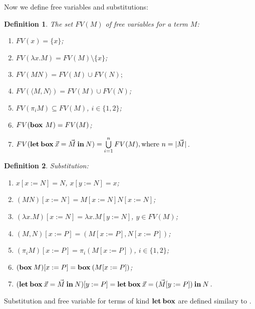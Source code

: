 \documentclass[a4paper]{article}
\newtheorem{defin}{Definition}
\begin{document}
  Now we define free variables and substitutions:

  \begin{defin} The set $FV(M)$ of free variables for a term $M$:

\begin{enumerate}
  \item $FV(x) = \{ x \}$;
  \item $FV(\lambda x. M) = FV(M) \setminus \{ x\}$;
  \item $FV(M N) = FV(M) \cup FV(N);$
  \item $FV(\langle M,N \rangle) = FV(M) \cup FV(N)$;
  \item $FV(\pi_i M) \subseteq FV(M)$, $i \in \{ 1, 2\}$;
  \item $FV(\text{\bf box } M) = FV(M)$;
  \item $FV({\bf let \: box} \: \vec{x} = \vec{M} {\: \bf in \:} N) = \bigcup \limits_{i = 1}^n FV(M), \text{where $n = |\vec{M}|$}$.
\end{enumerate}
  \end{defin}

  \begin{defin} Substitution:

\begin{enumerate}
  \item $x [x := N] = N$, $x [y := N] = x$;
  \item $(M N) [x := N] = M[x := N] N [x := N]$;
  \item $(\lambda x. M) [x := N] = \lambda x. M [y := N]$, $y \in FV(M)$;
  \item $(M, N)[x := P] = (M[x := P], N [x := P])$;
  \item $(\pi_i M) [x := P] = \pi_i (M[x := P])$, $i \in \{ 1, 2\}$;
  \item $({\bf box \: } M) [x := P] = {\bf box \: } (M [x := P])$;
  \item $({\bf let \: box \:}\vec{x} = \vec{M} {\: \bf in \:} N) [y := P] = {\bf let \: box \:} \vec{x} = (\vec{M} [y := P]) {\: \bf in \:} N$.
\end{enumerate}
  \end{defin}

Substitution and free variable for terms of kind ${\bf let \: box}$ are defined similary to \cite{ModalK}.
\end{document}
